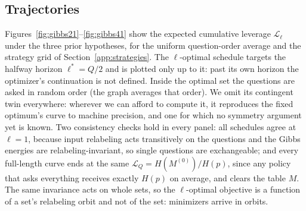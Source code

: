 \documentclass[11pt]{article}
\begin{document}
\subsection{Trajectories}\label{sec:gibbstraj}

Figures~\ref{fig:gibbs21}--\ref{fig:gibbs41} show the expected
cumulative leverage $\mathcal L_\ell$ under the three
prior hypotheses, for the uniform question-order average and the strategy grid of
Section~\ref{app:strategies}. The $\ell$-optimal schedule targets
the halfway horizon $\ell^* = Q/2$ and is plotted only up to it:
past its own horizon the optimizer's continuation is not defined.
Inside the optimal set the questions are asked in random
order (the graph averages that order). 
We omit its contingent twin everywhere: wherever we can
afford to compute it, it reproduces the fixed optimum's curve to
machine precision, and one for which no symmetry argument yet is known. 
Two consistency checks hold in every panel: all schedules agree at $\ell = 1$, because
input relabeling acts transitively on the questions and the Gibbs
energies are relabeling-invariant, so single questions are
exchangeable; and every full-length curve ends at the same
$\mathcal L_{Q} = H(M^{(0)})/H(p)$, since any policy that asks everything
receives exactly $H(p)$ on average, and clears the table $M$. The
same invariance acts on whole sets, so the $\ell$-optimal objective
is a function of a set's relabeling orbit and not of the set:
minimizers arrive in orbits.

\begin{center}
\end{center}
\end{document}
